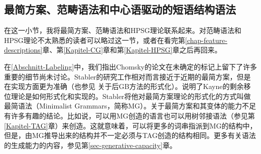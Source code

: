 \subsection{最简方案、范畴语法和中心语驱动的短语结构语法}
\label{Abschnitt-MG}\label{sec-MG}

在这一小节，我将最简方案、范畴语法和HPSG理论联系起来。对范畴语法和HPSG理论不太熟悉的读者可以略过这一节，或者在看完第\ref{chap-feature-descriptions}章、第\ref{Kapitel-CG}章和第\ref{Kapitel-HPSG}章之后再回来。

在\ref{Abschnitt-Labeling}中，我们指出Chomsky的论文在未确定的标记上留下了许多重要的细节尚未讨论。Stabler的研究工作相对而言接近于近期的最简方案，但是在实现方面更为准确（也参见 关于后GB方法的形式化）。\citet{Stabler2001a}说明了Kayne的剩余移位理论是如何形式化和实现的。Stabler将他对最简方案理论的形式化的方式叫做最简语法（Minimalist Grammars，简称MG）。关于最简方案和其变体\citep{Michaelis2001a-u}的能力不足有许多有趣的结论。比如说，可以用MG创造的语言也可以用树邻接语法\indextag（参见第\ref{Kapitel-TAG}章）来创造。这就意味着，可以将更多的词串指派到MG的结构中，但是，由MG推导出来的结构并不一定必须与TAG创造的结构相同。更多有关语法的生成能力的内容，参见第\ref{sec-generative-capacity}章。

